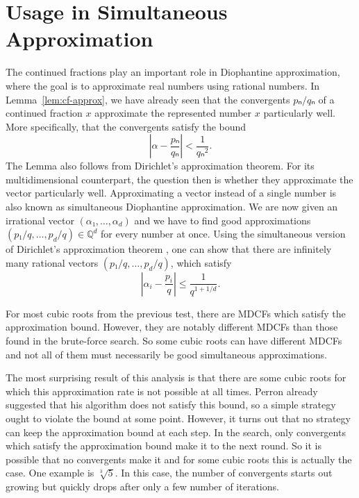 \section{Usage in Simultaneous Approximation}

The continued fractions play an important role in Diophantine approximation,
where the goal is to approximate real numbers using rational numbers.
In Lemma~\vref{lem:cf-approx}, we have already seen that the convergents
$pₙ/qₙ$ of a continued fraction $x$ approximate the represented number $x$
particularly well.
More specifically, that the convergents satisfy the bound
\[
  \left|α - \frac{pₙ}{qₙ}\right| < \frac{1}{qₙ^2}.
\]
The Lemma also follows from Dirichlet's approximation theorem.
For its multidimensional counterpart,
the question then is whether they approximate the vector particularly well.
Approximating a vector instead of a single number is also known as simultaneous
Diophantine approximation.
We are now given an irrational vector $(α₁, …, α_d)$ and we have to find good
approximations $(p₁/q, …, p_d/q) ∈ ℚ^d$ for every number at once.
Using the simultaneous version of Dirichlet's approximation theorem \cite{Schmidt80},
one can show that there are infinitely many rational vectors $(p₁/q, …, p_d/q)$,
which satisfy
\[
  \left|α_i - \frac{p_i}{q}\right| ≤ \frac{1}{q^{1 + 1/d}}.
\]

For most cubic roots from the previous test,
there are MDCFs which satisfy the approximation bound.
However, they are notably different MDCFs than those found in the brute-force
search.
So some cubic roots can have different MDCFs
and not all of them must necessarily be good simultaneous approximations.

The most surprising result of this analysis is that there are some cubic roots
for which this approximation rate is not possible at all times.
Perron already suggested that his algorithm does not satisfy this bound,
so a simple strategy ought to violate the bound at some point.
However, it turns out that no strategy can keep the approximation bound at each step.
In the search, only convergents which satisfy the approximation bound make it to the next round.
So it is possible that no convergents make it and for some cubic roots this is actually the case.
One example is $\sqrt[3]{5}$.
In this case, the number of convergents starts out growing but quickly drops
after only a few number of iterations.

